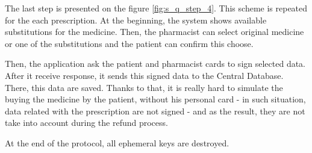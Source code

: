The last step is presented on the figure \ref{fig:s_q_step_4}. This scheme is repeated for the each prescription. At the beginning, the system shows available substitutions for the medicine. Then, the pharmacist can select original medicine or one of the substitutions and the patient can confirm this choose. 

Then, the application ask the patient and pharmacist cards to sign selected data. After it receive response, it sends this signed data to the Central Database. There, this data are saved. Thanks to that, it is really hard to simulate the buying the medicine by the patient, without his personal card - in such situation, data related with the prescription are not signed - and as the result, they are not take into account during the refund process. 

At the end of the protocol, all ephemeral keys are destroyed. 



